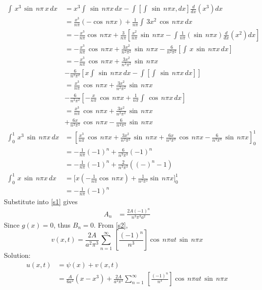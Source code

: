 \begin{align*}
\int\,x^3\,\sin\,n\pi\,x\,dx&=x^3\int\,\sin\,n\pi x\,dx-\int[\int\,\sin\,n\pi x,dx]\frac{d}{dx}(x^3)dx\\
&=\frac{x^3}{n\pi}(-\cos\,n\pi x)+\frac{1}{n\pi}\int\,3x^2\,\cos\,n\pi x\,dx\\
&=-\frac{x^3}{n\pi}\cos\,n\pi x+\frac{3}{n\pi}\left[\frac{x^2}{n\pi}\,\sin\,n\pi x-\int\frac{1}{n\pi}(\sin\,n\pi x)\frac{d}{dx}(x^2)dx\right]\\
&=-\frac{x^3}{n\pi}\,\cos\,n\pi x+\frac{3x^2}{n^2\pi^2}\,\sin\,n\pi x-\frac{6}{n^2\pi^2}\left[\int\,x\,\sin\,n\pi x\,dx\right]\\
&=-\frac{x^3}{n\pi}\,\cos\,n\pi x+\frac{3x^2}{n^2\pi^2}\,\sin\,n\pi x\\
& -\frac{6}{n^2\pi^2}\left[x\int\,\sin\,n\pi x\,dx-\int[\int\,\sin\,n\pi x\,dx]\right]\\
&=\frac{x^3}{n\pi}\,\cos\,n\pi x+\frac{3x^2}{n^2\pi^2}\,\sin\,n\pi x\\
&-\frac{6}{n^2\pi^2}\left[-\frac{x}{n\pi}\,\cos\,n\pi x+\frac{1}{n\pi}\int\,\cos\,n\pi x\,dx\right]\\
&=\frac{x^3}{n\pi}\,\cos\,n\pi x+\frac{3x^2}{n^2\pi^2}\,\sin\,n\pi x\\
&+\frac{6x}{n^3\pi^3}\,\cos\,n\pi x-\frac{6}{n^4\pi^4}\,\sin\,n\pi x\\
\int_0^1\,x^3\,\sin\,n\pi x\,dx&=\left[\frac{x^3}{n\pi}\,\cos\,n\pi x+\frac{3x^2}{n^2\pi^2}\,\sin\,n\pi x+\frac{6x}{n^3\pi^3}\,\cos\,n\pi x-\frac{6}{n^4\pi^4}\,\sin\,n\pi x\right]_0^1\\
&=-\frac{1}{n\pi}(-1)^n+\frac{6}{n^3\pi^3}(-1)^n\nonumber\\
&=-\frac{1}{n\pi}(-1)^n+\frac{2}{n^3\pi^3}((-)^n-1)\\
\int_0^1\,x\,\sin\,n\pi x\,dx&=[x(-\frac{1}{n\pi}\cos\,n\pi x)+\frac{1}{n^2\pi^2}\sin\,n\pi x\big]_0^1\\
&=-\frac{1}{n\pi}(-1)^n
\end{align*}
Substitute into \eqref{s1} gives
\begin{align}
A_n&=\frac{2A(-1)^n}{n^3\pi^3a^2}
\end{align}
Since $g(x)=0$, thus $B_n=0$. From \eqref{s2},
\begin{equation}
v(x,t)=\frac{2A}{a^2\pi^3}\sum_{n=1}^\infty\,\left[\frac{(-1)^n}{n^3}\right]\cos\,n\pi at\,\sin\,n\pi x
\end{equation}
Solution:
\begin{align*}
u(x,t)&=\psi(x)+v(x,t)\\
&=\frac{A}{6a^2}(x-x^3)+\frac{2A}{a^2\pi^3}\sum_{n=1}^\infty\,\left[\frac{(-1)^n}{n^3}\right]\cos\,n\pi at\,\sin\,n\pi x
\end{align*}

